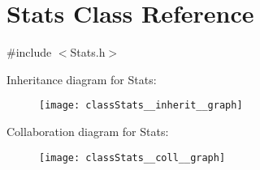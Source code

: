 \hypertarget{classStats}{}\section{Stats Class Reference}
\label{classStats}


{\ttfamily \#include $<$Stats.\+h$>$}



Inheritance diagram for Stats\+:\nopagebreak
\begin{figure}[H]
\begin{center}
\leavevmode
\texttt{[image: classStats\_\_inherit\_\_graph]}
\end{center}
\end{figure}


Collaboration diagram for Stats\+:\nopagebreak
\begin{figure}[H]
\begin{center}
\leavevmode
\texttt{[image: classStats\_\_coll\_\_graph]}
\end{center}
\end{figure}
